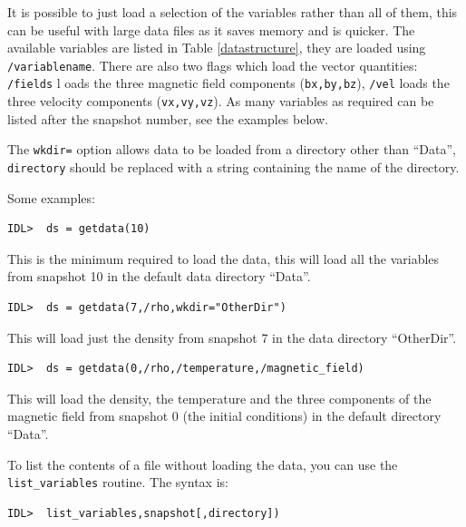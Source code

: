 \documentclass[11pt]{article}
\begin{document}
It is possible to just load a selection of the variables rather than all of them, this can be useful with large 
data files as it saves memory and is quicker. The available variables are listed in Table \ref{datastructure}, they 
are loaded using \texttt{/variablename}. There are also two flags which load the vector quantities: \texttt{/fields} l
oads the three magnetic field components (\texttt{bx,by,bz}), \texttt{/vel} loads the three velocity components 
(\texttt{vx,vy,vz}). As many variables as required can be listed after the snapshot number, see the examples below.

The \texttt{wkdir=} option allows data to be loaded from a directory other than ``Data'', \texttt{directory} should 
be replaced with a string containing the name of the directory.

Some examples:
\begin{verbatim}
IDL>  ds = getdata(10)
\end{verbatim}
This is the minimum required to load the data, this will load all the variables from snapshot 10 in the default data directory ``Data''.

\begin{verbatim}
IDL>  ds = getdata(7,/rho,wkdir="OtherDir")
\end{verbatim}
This will load just the density from snapshot 7 in the data directory ``OtherDir''.

\begin{verbatim}
IDL>  ds = getdata(0,/rho,/temperature,/magnetic_field)
\end{verbatim}
This will load the density, the temperature and the three components of the magnetic field from snapshot 0 
(the initial conditions) in the default directory ``Data''.

To list the contents of a file without loading the data, you can use the \texttt{list\_variables} routine. The syntax is:

\begin{verbatim}
IDL>  list_variables,snapshot[,directory])
\end{verbatim}
\end{document}
